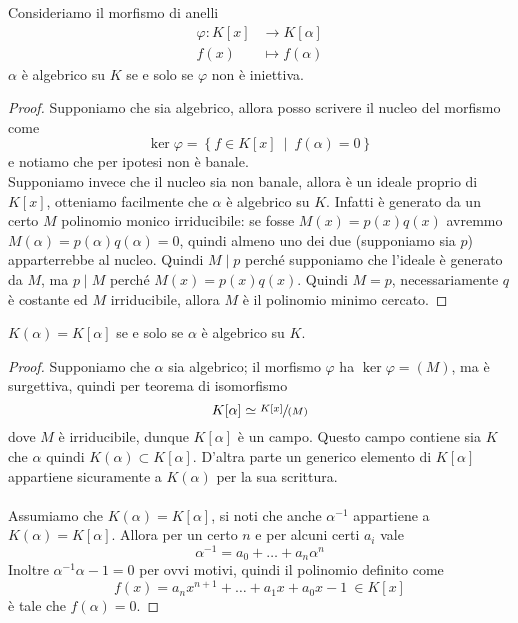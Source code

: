\begin{proposizione}
	Consideriamo il morfismo di anelli 
	\begin{align*}
	\varphi: K[x] &\longrightarrow K[\alpha]\\
	f(x)&\longmapsto f(\alpha)
	\end{align*}
	$\alpha$ è algebrico su $K$ se e solo se $\varphi$ non è iniettiva.
\end{proposizione}
\begin{proof}
	Supponiamo che sia algebrico, allora posso scrivere il nucleo del morfismo come 
	\begin{equation*}
	\ker\varphi = \left\{f\in K[x] \ \mid \ f(\alpha)=0\right\}
	\end{equation*}
	e notiamo che per ipotesi non è banale. \\ Supponiamo invece che il nucleo sia non banale, allora è un ideale proprio di $K[x]$, otteniamo facilmente che $\alpha$ è algebrico su $K$. Infatti è generato da un certo $M$ polinomio monico irriducibile: se fosse $M(x)=p(x)q(x)$ avremmo $M(\alpha)=p(\alpha)q(\alpha)=0$, quindi almeno uno dei due (supponiamo sia $p$) apparterrebbe al nucleo. Quindi $M \mid p$ perché supponiamo che l'ideale è generato da $M$, ma $p\mid M$ perché $M(x) = p(x)q(x)$. Quindi $M = p$, necessariamente $q$ è costante ed $M$ irriducibile, allora $M$ è il polinomio minimo cercato.
\end{proof}
\begin{teorema}
	$K(\alpha)=K[\alpha]$ se e solo se $\alpha$ è algebrico su $K$.
\end{teorema}
\begin{proof}
	Supponiamo che $\alpha$ sia algebrico; il morfismo $\varphi$ ha $\ker \varphi = (M)$, ma è surgettiva, quindi per teorema di isomorfismo
	\begin{equation*}
	K[\alpha]\simeq\sfrac{K[x]}{(M)}
	\end{equation*}
	dove $M$ è irriducibile, dunque $K[\alpha]$ è un campo. Questo campo contiene sia $K$ che $\alpha$ quindi $K(\alpha)\subset K[\alpha]$. D'altra parte un generico elemento di $K[\alpha]$ appartiene sicuramente a $K(\alpha)$ per la sua scrittura. \\ \\
	Assumiamo che $K(\alpha)=K[\alpha]$, si noti che anche $\alpha^{-1}$ appartiene a $K(\alpha)=K[\alpha]$. Allora per un certo $n$ e per alcuni certi $a_i$ vale
	\begin{equation*}
	\alpha^{-1}=a_0+\dots+a_n\alpha^n
	\end{equation*}
	Inoltre $\alpha^{-1}\alpha-1=0$ per ovvi motivi, quindi il polinomio definito come
	\begin{equation*}
	f(x)=a_nx^{n+1}+\dots+a_1x+a_0x-1 \ \in K[x]
	\end{equation*}
	è tale che $f(\alpha)=0$.
\end{proof}
